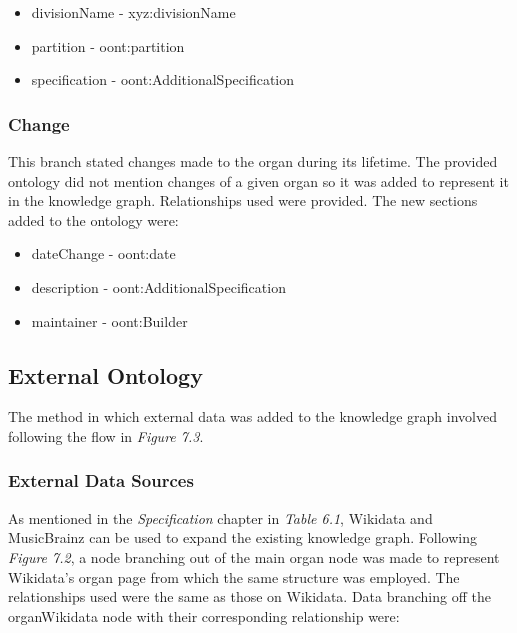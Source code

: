 \vspace{-0.1cm}
\begin{itemize}
    \itemsep0em 
    \item divisionName - xyz:divisionName
    \vspace{-0.05cm}
    \item partition - oont:partition
    \vspace{-0.05cm}
    \item specification - oont:AdditionalSpecification
\end{itemize}

\subsubsection{Change}
\hspace*{0.5cm} This branch stated changes made to the organ during its lifetime. The provided ontology did not mention changes of a given organ so it was added to represent it in the knowledge graph. Relationships used were provided. The new sections added to the ontology were:

\vspace{-0.15cm}
\begin{itemize}
    \itemsep0em 
    \item dateChange - oont:date 
    \vspace{-0.05cm}
    \item description - oont:AdditionalSpecification
    \vspace{-0.05cm}
    \item maintainer - oont:Builder
\end{itemize}
\vspace{-0.25cm}

\subsection{External Ontology}
\hspace*{0.5cm} The method in which external data was added to the knowledge graph involved following the flow in \textit{Figure 7.3}.

\subsubsection{External Data Sources}
\hspace*{0.5cm} As mentioned in the \textit{Specification} chapter in \textit{Table 6.1}, Wikidata and MusicBrainz can be used to expand the existing knowledge graph. Following \textit{Figure 7.2}, a node branching out of the main organ node was made to represent Wikidata's organ page \cite{organwikidata} from which the same structure was employed. The relationships used were the same as those on Wikidata. Data branching off the organWikidata node with their corresponding relationship were:

